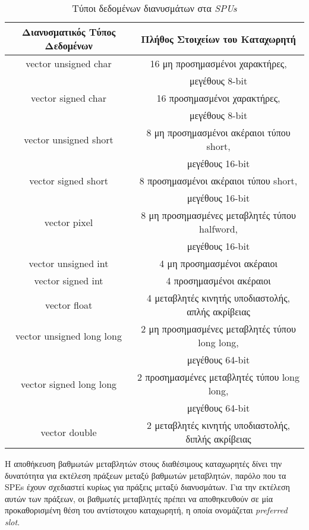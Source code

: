 \begin{table}
\centering
\begin{tabular}{|c|c|}
  \hline
  Διανυσματικός Τύπος Δεδομένων & Πλήθος Στοιχείων του Καταχωρητή \\ \hline
  vector unsigned char & 16 μη προσημασμένοι χαρακτήρες, \\
                       & μεγέθους 8-bit \\ \hline
  vector signed char & 16 προσημασμένοι χαρακτήρες, \\
                     & μεγέθους 8-bit \\ \hline
  vector unsigned short & 8 μη προσημασμένοι ακέραιοι τύπου short, \\
                        & μεγέθους 16-bit \\ \hline
  vector signed short & 8 προσημασμένοι ακέραιοι τύπου short, \\
                      & μεγέθους 16-bit \\ \hline
  vector pixel & 8 μη προσημασμένες μεταβλητές τύπου halfword, \\
               & μεγέθους 16-bit \\ \hline
  vector unsigned int & 4 μη προσημασμένοι ακέραιοι \\ \hline
  vector signed int & 4 προσημασμένοι ακέραιοι \\ \hline
  vector float & 4 μεταβλητές κινητής υποδιαστολής, απλής ακρίβειας \\ \hline
  vector unsigned long long & 2 μη προσημασμένες μεταβλητές τύπου long long, \\
                            & μεγέθους 64-bit \\ \hline
  vector signed long long &  2 προσημασμένες μεταβλητές τύπου long long, \\
                          & μεγέθους 64-bit \\ \hline
  vector double & 2 μεταβλητές κινητής υποδιαστολής, διπλής ακρίβειας \\ \hline
\end{tabular}
\caption{Τύποι δεδομένων διανυσμάτων στα \textsl{SPUs}}
\label{table:tab32}
\end{table}
Η αποθήκευση βαθμωτών μεταβλητών στους διαθέσιμους καταχωρητές δίνει την δυνατότητα για εκτέλεση πράξεων μεταξύ βαθμωτών μεταβλητών, παρόλο που τα \acp{SPE} έχουν σχεδιαστεί κυρίως για πράξεις μεταξύ διανυσμάτων. Για την εκτέλεση αυτών των πράξεων, οι βαθμωτές μεταβλητές πρέπει να αποθηκευθούν σε μία προκαθορισμένη θέση του αντίστοιχου καταχωρητή, η οποία ονομάζεται \textsl{preferred slot}.\newline \indent
